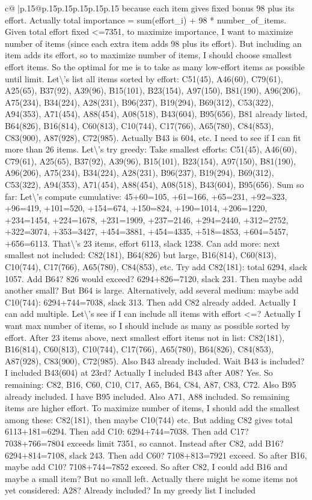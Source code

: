 \documentclass{article}
\begin{document}
{\begin{supertabular}{c@{$\;$}|p{.15\linewidth}@{}p{.15\linewidth}p{.15\linewidth}p{.15\linewidth}p{.15\linewidth}p{.15\linewidth}}
{{{because each item gives fixed bonus 98 plus its effort. Actually total importance = sum(effort\_i) + 98 * number\_of\_items. Given total effort fixed <=7351, to maximize importance, I want to maximize number of items (since each extra item adds 98 plus its effort). But including an item adds its effort, so to maximize number of items, I should choose smallest effort items. So the optimal for me is to take as many low{-}effort items as possible until limit. Let\textbackslash{}'s list all items sorted by effort: C51(45), A46(60), C79(61), A25(65), B37(92), A39(96), B15(101), B23(154), A97(150), B81(190), A96(206), A75(234), B34(224), A28(231), B96(237), B19(294), B69(312), C53(322), A94(353), A71(454), A88(454), A08(518), B43(604), B95(656), B81 already listed, B64(826), B16(814), C60(813), C10(744), C17(766), A65(780), C84(853), C83(900), A87(928), C72(985). Actually B43 is 604, etc. I need to see if I can fit more than 26 items. Let\textbackslash{}'s try greedy: Take smallest efforts: C51(45), A46(60), C79(61), A25(65), B37(92), A39(96), B15(101), B23(154), A97(150), B81(190), A96(206), A75(234), B34(224), A28(231), B96(237), B19(294), B69(312), C53(322), A94(353), A71(454), A88(454), A08(518), B43(604), B95(656). Sum so far: Let\textbackslash{}'s compute cumulative: 45+60=105, +61=166, +65=231, +92=323, +96=419, +101=520, +154=674, +150=824, +190=1014, +206=1220, +234=1454, +224=1678, +231=1909, +237=2146, +294=2440, +312=2752, +322=3074, +353=3427, +454=3881, +454=4335, +518=4853, +604=5457, +656=6113. That\textbackslash{}'s 23 items, effort 6113, slack 1238. Can add more: next smallest not included: C82(181), B64(826) but large, B16(814), C60(813), C10(744), C17(766), A65(780), C84(853), etc. Try add C82(181): total 6294, slack 1057. Add B64? 826 would exceed? 6294+826=7120, slack 231. Then maybe add another small? But B64 is large. Alternatively, add several medium: maybe add C10(744): 6294+744=7038, slack 313. Then add C82 already added. Actually I can add multiple. Let\textbackslash{}'s see if I can include all items with effort <=? Actually I want max number of items, so I should include as many as possible sorted by effort. After 23 items above, next smallest effort items not in list: C82(181), B16(814), C60(813), C10(744), C17(766), A65(780), B64(826), C84(853), A87(928), C83(900), C72(985). Also B43 already included. Wait B43 is included? I included B43(604) at 23rd? Actually I included B43 after A08? Yes. So remaining: C82, B16, C60, C10, C17, A65, B64, C84, A87, C83, C72. Also B95 already included. I have B95 included. Also A71, A88 included. So remaining items are higher effort. To maximize number of items, I should add the smallest among these: C82(181), then maybe C10(744) etc. But adding C82 gives total 6113+181=6294. Then add C10: 6294+744=7038. Then add C17? 7038+766=7804 exceeds limit 7351, so cannot. Instead after C82, add B16? 6294+814=7108, slack 243. Then add C60? 7108+813=7921 exceed. So after B16, maybe add C10? 7108+744=7852 exceed. So after C82, I could add B16 and maybe a small item? But no small left. Actually there might be some items not yet considered: A28? Already included? In my greedy list I included }}}
\end{supertabular}}
\end{document}
